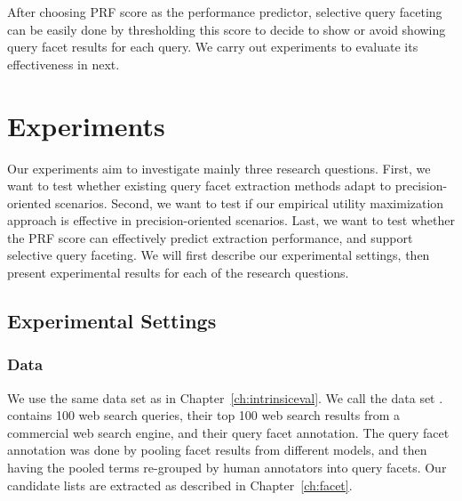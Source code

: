 After choosing PRF score as the performance predictor, selective query faceting can be easily done by thresholding this score to decide to show or avoid showing query facet results for each query. We carry out experiments to evaluate its effectiveness in next.


\section{Experiments}
\label{sec:precision-experiment}
Our experiments aim to investigate mainly three research questions. First, we want to test whether existing query facet extraction methods adapt to precision-oriented scenarios. Second, we want to test if our empirical utility maximization approach is effective in precision-oriented scenarios. Last, we want to test whether the PRF score can effectively predict extraction performance, and support selective query faceting. We will first describe our experimental settings, then present experimental results for each of the research questions.

\subsection{Experimental Settings}
\subsubsection{Data}
We use the same data set as in Chapter~\ref{ch:intrinsiceval}. We call the data set \DQF. \DQF contains 100 web search queries, their top 100 web search results from a commercial web search engine, and their query facet annotation. The query facet annotation was done by pooling facet results from different models, and then having the pooled terms re-grouped by human annotators into query facets. Our candidate lists are extracted as described in Chapter~\ref{ch:facet}.

